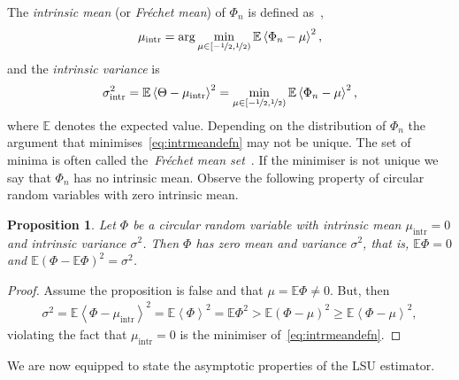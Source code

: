 \documentclass[aap,preprint]{imsart}
\newcommand{\expect}{{\mathbb E}}
\newcommand{\fracpart}[1]{\left\langle #1 \right\rangle}
\newtheorem{proposition}{Proposition}
\begin{document}
The \emph{intrinsic mean} (or \emph{Fr\'{e}chet mean}) of $\Phi_n$ is defined as~\cite{McKilliam_mean_dir_est_sq_arc_length2010,Bhattacharya_int_ext_means_2003,Bhattacharya_int_ext_means_2005},
\begin{equation}\label{eq:intrmeandefn}
 \mu_{\text{intr}}  = \arg \min_{\mu \in [-\nicefrac{1}{2}, \nicefrac{1}{2})} \expect \fracpart{\Phi_n - \mu}^2, 
\end{equation}
and the \emph{intrinsic variance} is
\[
\sigma_{\text{intr}}^2 = \expect\fracpart{\Theta - \mu_{\text{intr}}}^2 = \min_{\mu \in [-\nicefrac{1}{2}, \nicefrac{1}{2})} \expect \fracpart{\Phi_n - \mu}^2,
\]
where $\expect$ denotes the expected value.  Depending on the distribution of $\Phi_n$ the argument that minimises~\eqref{eq:intrmeandefn} may not be unique.  The set of minima is often called the~\emph{Fr\'{e}chet mean set}~\cite{Bhattacharya_int_ext_means_2003,Bhattacharya_int_ext_means_2005}.  If the minimiser is not unique we say that $\Phi_n$ has no intrinsic mean.  
Observe the following property of circular random variables with zero intrinsic mean.
\begin{proposition}\label{prop:zerointmeanzeromean}
Let $\Phi$ be a circular random variable with intrinsic mean $\mu_{\text{intr}} = 0$ and intrinsic variance $\sigma^2$.  Then $\Phi$ has zero mean and variance $\sigma^2$, that is, $\expect \Phi = 0$ and $\expect (\Phi - \expect \Phi)^2  = \sigma^2$.
\end{proposition}
\begin{proof}
Assume the proposition is false and that $\mu = \expect \Phi \neq 0$.  But, then 
\begin{align*}
\sigma^2 = \expect\fracpart{\Phi -  \mu_{\text{intr}}}^2 = \expect\fracpart{\Phi}^2 = \expect \Phi^2 >  \expect (\Phi - \mu)^2 \geq  \expect \fracpart{\Phi - \mu}^2,
\end{align*}
violating the fact that $\mu_{\text{intr}} = 0$ is the minimiser of~\eqref{eq:intrmeandefn}.
\end{proof}
We are now equipped to state the asymptotic properties of the LSU estimator.

\end{document}
